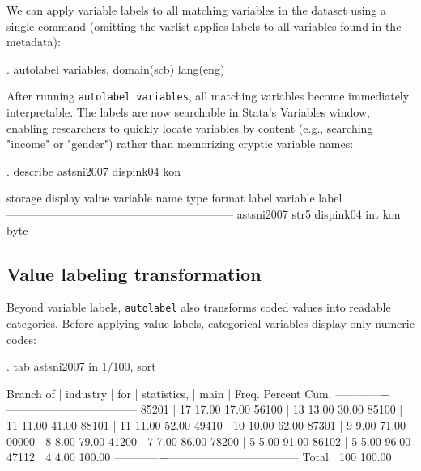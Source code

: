 We can apply variable labels to all matching variables in the dataset using a single command (omitting the varlist applies labels to all variables found in the metadata):

\begin{stlog}
. autolabel variables, domain(scb) lang(eng)
\end{stlog}

After running \texttt{autolabel variables}, all matching variables become immediately interpretable. The labels are now searchable in Stata's Variables window, enabling researchers to quickly locate variables by content (e.g., searching "income" or "gender") rather than memorizing cryptic variable names:

\begin{stlog}
. describe astsni2007 dispink04 kon

              storage   display    value
variable name   type    format     label      variable label
------------------------------------------------------------
astsni2007      str5    %
dispink04       int     %
kon             byte    %
\end{stlog}

\subsection{Value labeling transformation}

Beyond variable labels, \texttt{autolabel} also transforms coded values into readable categories. Before applying value labels, categorical variables display only numeric codes:
\begin{stlog}
. tab astsni2007 in 1/100, sort

  Branch of |
   industry |
        for |
statistics, |
       main |      Freq.     Percent        Cum.
------------+-----------------------------------
      85201 |         17       17.00       17.00
      56100 |         13       13.00       30.00
      85100 |         11       11.00       41.00
      88101 |         11       11.00       52.00
      49410 |         10       10.00       62.00
      87301 |          9        9.00       71.00
      00000 |          8        8.00       79.00
      41200 |          7        7.00       86.00
      78200 |          5        5.00       91.00
      86102 |          5        5.00       96.00
      47112 |          4        4.00      100.00
------------+-----------------------------------
      Total |        100      100.00
\end{stlog}

